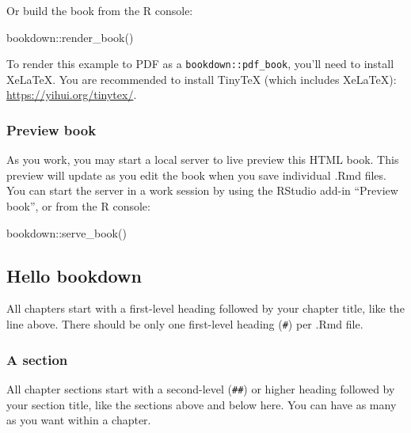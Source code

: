 \documentclass[
]{bxjsbook}
\newenvironment{Shaded}{\begin{snugshade}}{\end{snugshade}}
\newcommand{\FunctionTok}[1]{\textcolor[rgb]{0.00,0.00,0.00}{#1}}
\newcommand{\NormalTok}[1]{#1}
\newcommand{\SpecialCharTok}[1]{\textcolor[rgb]{0.00,0.00,0.00}{#1}}
\theoremstyle{definition}
\theoremstyle{definition}
\theoremstyle{definition}
\theoremstyle{definition}
\theoremstyle{remark}
\begin{document}
Or build the book from the R console:

\begin{Shaded}
\begin{Highlighting}[]
\NormalTok{bookdown}\SpecialCharTok{::}\FunctionTok{render\_book}\NormalTok{()}
\end{Highlighting}
\end{Shaded}

To render this example to PDF as a \texttt{bookdown::pdf\_book}, you'll need to install XeLaTeX. You are recommended to install TinyTeX (which includes XeLaTeX): \url{https://yihui.org/tinytex/}.

\hypertarget{preview-book}{%
\subsubsection{Preview book}\label{preview-book}}

As you work, you may start a local server to live preview this HTML book. This preview will update as you edit the book when you save individual .Rmd files. You can start the server in a work session by using the RStudio add-in ``Preview book'', or from the R console:

\begin{Shaded}
\begin{Highlighting}[]
\NormalTok{bookdown}\SpecialCharTok{::}\FunctionTok{serve\_book}\NormalTok{()}
\end{Highlighting}
\end{Shaded}

\hypertarget{hello-bookdown}{%
\subsection{Hello bookdown}\label{hello-bookdown}}

All chapters start with a first-level heading followed by your chapter title, like the line above. There should be only one first-level heading (\texttt{\#}) per .Rmd file.

\hypertarget{a-section}{%
\subsubsection{A section}\label{a-section}}

All chapter sections start with a second-level (\texttt{\#\#}) or higher heading followed by your section title, like the sections above and below here. You can have as many as you want within a chapter.
\end{document}
